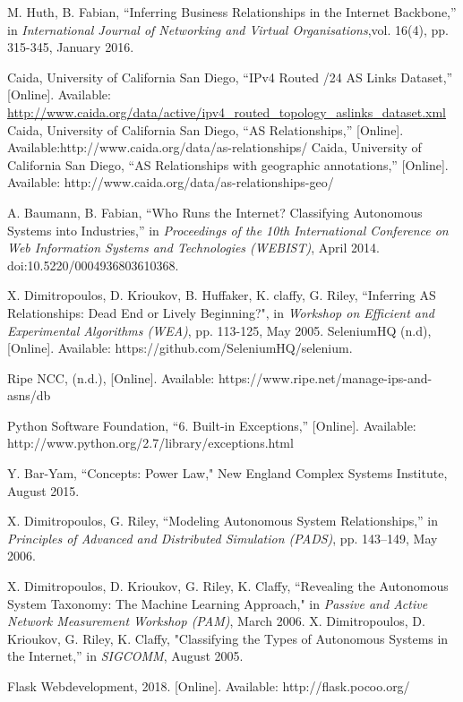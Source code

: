 \documentclass[conference, 11pt]{IEEEtran}
\begin{document}
\begin{thebibliography}{00}
 M. Huth, B. Fabian, ``Inferring Business Relationships in the Internet Backbone,'' in \textit{International Journal of Networking and Virtual Organisations},vol. 16(4), pp. 315-345, January 2016. %

 Caida, University of California San Diego, ``IPv4 Routed /24 AS Links Dataset,'' [Online]. Available: \url{http://www.caida.org/data/active/ipv4\_routed\_topology\_aslinks\_dataset.xml} %
Caida, University of California San Diego, ``AS Relationships,'' [Online]. Available:http://www.caida.org/data/as-relationships/ %
Caida, University of California San Diego, ``AS Relationships with geographic annotations,'' [Online]. Available: http://www.caida.org/data/as-relationships-geo/ %


 A. Baumann, B. Fabian, ``Who Runs the Internet? Classifying Autonomous Systems into Industries,'' in \textit{Proceedings of the 10th International Conference on Web Information Systems and Technologies (WEBIST)}, April 2014. doi:10.5220/0004936803610368. %



 X. Dimitropoulos, D. Krioukov, B. Huffaker, K. claffy, G. Riley, ``Inferring AS Relationships: Dead End or Lively Beginning?", in \textit{Workshop on Efficient and Experimental Algorithms (WEA)}, pp. 113-125, May 2005. %
SeleniumHQ (n.d), [Online]. Available: https://github.com/SeleniumHQ/selenium. %

Ripe NCC, (n.d.), [Online]. Available: https://www.ripe.net/manage-ips-and-asns/db %

Python Software Foundation, ``6. Built-in Exceptions,'' [Online]. Available: http://www.python.org/2.7/library/exceptions.html %

 Y. Bar-Yam, ``Concepts: Power Law," New England Complex Systems Institute, August 2015. %

X. Dimitropoulos, G. Riley, ``Modeling Autonomous System Relationships,'' in \textit{Principles of Advanced and Distributed Simulation (PADS)}, pp. 143--149, May 2006. %



X. Dimitropoulos, D. Krioukov, G. Riley, K. Claffy, ``Revealing the Autonomous System Taxonomy: The Machine Learning Approach," in \textit{Passive and Active Network Measurement Workshop (PAM)}, March 2006. %
X. Dimitropoulos, D. Krioukov, G. Riley, K. Claffy, "Classifying the Types of Autonomous Systems in the Internet,'' in \textit{SIGCOMM}, August 2005. %



Flask Webdevelopment, 2018. [Online]. Available: http://flask.pocoo.org/



\end{thebibliography}
\end{document}
